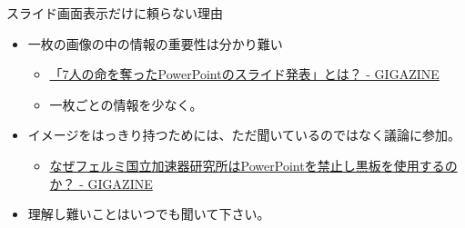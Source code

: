 \begin{frame}

\begin{block}{スライド画面表示だけに頼らない理由}

\begin{itemize}

\item
  一枚の画像の中の情報の重要性は分かり難い

  \begin{itemize}
  
  \item
    \href{https://gigazine.net/news/20190506-powerpoint-slide-killed-seven-people/}{「7人の命を奪ったPowerPointのスライド発表」とは？
    - GIGAZINE}
  \item
    一枚ごとの情報を少なく。
  \end{itemize}
\item
  イメージをはっきり持つためには、ただ聞いているのではなく議論に参加。

  \begin{itemize}
  
  \item
    \href{https://gigazine.net/news/20140413-switch-to-whiteboard/}{なぜフェルミ国立加速器研究所はPowerPointを禁止し黒板を使用するのか？
    - GIGAZINE}
  \end{itemize}
\item
  {理解し難いことはいつでも聞いて下さい。}
\end{itemize}

\end{block}

\end{frame}

